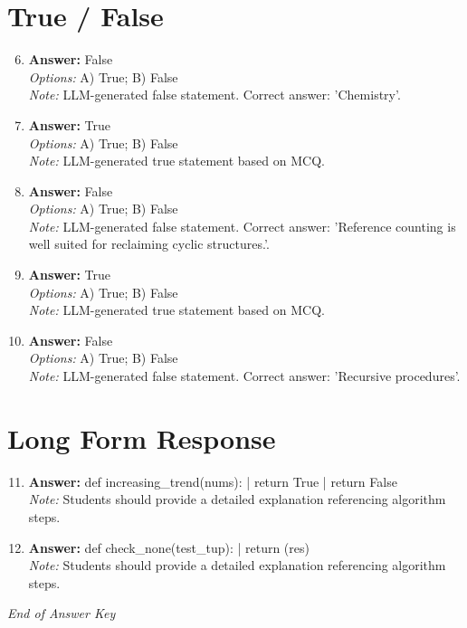 \documentclass[12pt]{article}
\begin{document}
\section*{True / False}
\begin{enumerate}[label=\arabic*.]
\setcounter{enumi}{5}
\item \textbf{Answer:} False
\\ \textit{Options:} A) True; B) False
\\ \textit{Note:} LLM-generated false statement. Correct answer: 'Chemistry'.
\item \textbf{Answer:} True
\\ \textit{Options:} A) True; B) False
\\ \textit{Note:} LLM-generated true statement based on MCQ.
\item \textbf{Answer:} False
\\ \textit{Options:} A) True; B) False
\\ \textit{Note:} LLM-generated false statement. Correct answer: 'Reference counting is well suited for reclaiming cyclic structures.'.
\item \textbf{Answer:} True
\\ \textit{Options:} A) True; B) False
\\ \textit{Note:} LLM-generated true statement based on MCQ.
\item \textbf{Answer:} False
\\ \textit{Options:} A) True; B) False
\\ \textit{Note:} LLM-generated false statement. Correct answer: 'Recursive procedures'.
\end{enumerate}

\section*{Long Form Response}
\begin{enumerate}[label=\arabic*.]
\setcounter{enumi}{10}
\item \textbf{Answer:} def increasing\_trend(nums): | return True | return False
\\ \textit{Note:} Students should provide a detailed explanation referencing algorithm steps.
\item \textbf{Answer:} def check\_none(test\_tup): | return (res)
\\ \textit{Note:} Students should provide a detailed explanation referencing algorithm steps.
\end{enumerate}

\vfill
\noindent\textit{End of Answer Key}
\end{document}
